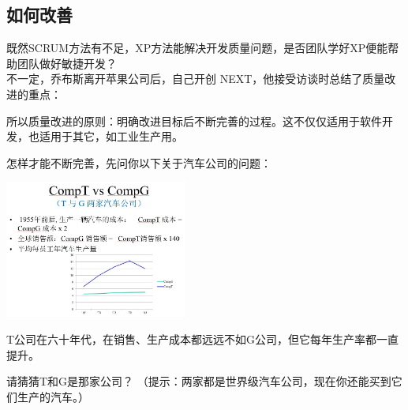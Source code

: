 \hypertarget{ux5982ux4f55ux6539ux5584}{%
\subsection{如何改善}\label{ux5982ux4f55ux6539ux5584}}

既然SCRUM方法有不足，XP方法能解决开发质量问题，是否团队学好XP便能帮助团队做好敏捷开发？\\
不一定，乔布斯离开苹果公司后，自己开创
NEXT，他接受访谈时总结了质量改进的重点：


所以质量改进的原则：明确改进目标后不断完善的过程。这不仅仅适用于软件开发，也适用于其它，如工业生产用。

怎样才能不断完善，先问你以下关于汽车公司的问题：


\includegraphics[width=6cm]{TvsGcompScreenshot_2023-06-07_121806.jpg}

T公司在六十年代，在销售、生产成本都远远不如G公司，但它每年生产率都一直提升。

请猜猜T和G是那家公司？
（提示：两家都是世界级汽车公司，现在你还能买到它们生产的汽车。）

\begin{description}
\item[]
\begin{description}
\tightlist
\item[]
= = = = = = = = = = = =
\end{description}
\end{description}

